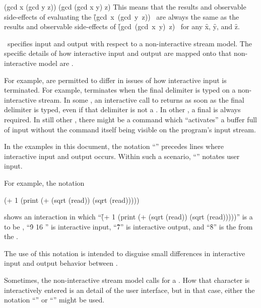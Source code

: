 \code
 (gcd x (gcd y z)) \EQ (gcd (gcd x y) z)
\endcode
This means that the results and observable side-effects of evaluating
the 
\hbox{\f{(gcd x (gcd y z))} } are always the same as the results
and observable side-effects of
\hbox{\f{(gcd (gcd x y) z)} } for any 
\f{x}, \f{y}, and \f{z}.
                      

\itemitem{{\OUT}}

\clisp\ specifies input and output with respect to a non-interactive stream model.
The specific details of how interactive input and output are mapped onto that
non-interactive model are .

For example,  are permitted to differ in issues 
of how interactive input is terminated.  For example, 
terminates when the final delimiter is typed on a non-interactive stream.
In some , an interactive call to  returns
as soon as the final delimiter is typed, even if that delimiter is not a .
In other , a final  is always required.
In still other , there might be a command which ``activates''
a buffer full of input without the command itself being visible on the program's
input stream.

In the examples in this document, the notation ``{\OUT}'' precedes 
lines where interactive input and output occurs.  Within such a scenario,
``'' notates user input.

For example, the notation

\code
 (+ 1 (print (+ (sqrt (read)) (sqrt (read)))))
\OUT {}
\endcode

shows an interaction in which
  ``\f{(+ 1 (print (+ (sqrt (read)) (sqrt (read)))))}''
    is a  to be ,
  ``\f{9 16 }'' is interactive input,
  ``\f{7}'' is interactive output, and 
  ``\f{8}'' is the   from the .

The use of this notation is intended to disguise small differences 
in interactive input and output behavior between .

Sometimes, the non-interactive stream model calls for a .
How that  character is interactively entered is an 
 detail of the user interface, but in that
case, either the notation ``\NewlineChar'' or ``\CRLF'' might be used.

